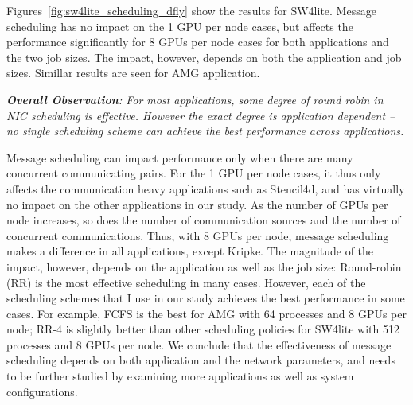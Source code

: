 Figures~\ref{fig:sw4lite_scheduling_dfly} show the
results for SW4lite. Message scheduling has no impact on the 1 GPU per node cases, but
affects the performance significantly for 8 GPUs per node cases for both applications and the two
job sizes. The impact, however, depends on both the application and job sizes.
Simillar results are seen for AMG application.

\vspace{1em}
\noindent
{\it \textbf{Overall Observation}:
For most applications, some degree of round robin in NIC scheduling is effective. However
    the exact degree is application dependent -- no single scheduling scheme can achieve the best
  performance across applications.}

Message scheduling can impact performance only when there are many concurrent
communicating pairs. For the 1 GPU per node cases, it thus only affects the
communication heavy applications such as Stencil4d, and has virtually no impact
on the other applications in our study. As the number of GPUs per node
increases, so does the  number of communication sources and the number of
concurrent communications. Thus, with 8 GPUs per node, message scheduling makes
a difference in all applications, except Kripke.  The magnitude of the impact,
however, depends on the application as well as the job size: Round-robin (RR) is
the most effective scheduling in many cases.  However, each of the scheduling
schemes that I use in our study achieves the best performance in some cases.
For example, FCFS is the best for AMG with 64 processes and 8 GPUs per node;
RR-4 is slightly better than other scheduling policies for SW4lite with 512
processes and 8 GPUs per node.  We conclude that the effectiveness of message
scheduling depends on both application and the network parameters, and needs to
be further studied by examining more applications as well as system
configurations. 




